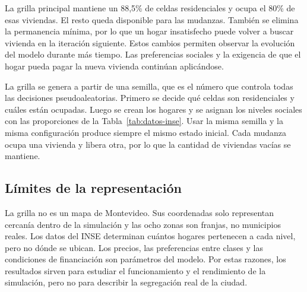 La grilla principal mantiene un 88,5\% de celdas residenciales y ocupa el 80\% de esas viviendas. El resto queda disponible para las mudanzas. También se elimina la permanencia mínima, por lo que un hogar insatisfecho puede volver a buscar vivienda en la iteración siguiente. Estos cambios permiten observar la evolución del modelo durante más tiempo. Las preferencias sociales y la exigencia de que el hogar pueda pagar la nueva vivienda continúan aplicándose.

La grilla se genera a partir de una semilla, que es el número que controla todas las decisiones pseudoaleatorias. Primero se decide qué celdas son residenciales y cuáles están ocupadas. Luego se crean los hogares y se asignan los niveles sociales con las proporciones de la Tabla~\ref{tab:datos-inse}. Usar la misma semilla y la misma configuración produce siempre el mismo estado inicial. Cada mudanza ocupa una vivienda y libera otra, por lo que la cantidad de viviendas vacías se mantiene.

\subsection{Límites de la representación}

La grilla no es un mapa de Montevideo. Sus coordenadas solo representan cercanía dentro de la simulación y las ocho zonas son franjas, no municipios reales. Los datos del INSE determinan cuántos hogares pertenecen a cada nivel, pero no dónde se ubican. Los precios, las preferencias entre clases y las condiciones de financiación son parámetros del modelo. Por estas razones, los resultados sirven para estudiar el funcionamiento y el rendimiento de la simulación, pero no para describir la segregación real de la ciudad.
